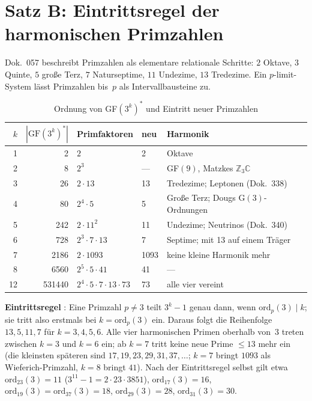 \section{Satz B: Eintrittsregel der harmonischen Primzahlen}

Dok.~057 beschreibt Primzahlen als elementare relationale Schritte:
$2$ Oktave, $3$ Quinte, $5$ große Terz, $7$ Naturseptime, $11$ Undezime,
$13$ Tredezime. Ein $p$-limit-System lässt Primzahlen bis~$p$ als Intervallbausteine zu.

\begin{table}[H]
\centering
\caption{Ordnung von GF$(3^k)^*$ und Eintritt neuer Primzahlen}
\begin{tabular}{rrlll}
\toprule
$k$ & $|\text{GF}(3^k)^*|$ & Primfaktoren & neu & Harmonik \\
\midrule
1 & 2 & $2$ & 2 & Oktave \\
2 & 8 & $2^3$ & --- & GF$(9)$, Matzkes $\mathbb{Z}_3\mathbb{C}$ \\
3 & 26 & $2 \cdot 13$ & 13 & Tredezime; Leptonen (Dok.~338) \\
4 & 80 & $2^4 \cdot 5$ & 5 & Große Terz; Dougs G$(3)$-Ordnungen \\
5 & 242 & $2 \cdot 11^2$ & 11 & Undezime; Neutrinos (Dok.~340) \\
6 & 728 & $2^3 \cdot 7 \cdot 13$ & 7 & Septime; mit 13 auf einem Träger \\
7 & 2186 & $2 \cdot 1093$ & 1093 & keine kleine Harmonik mehr \\
8 & 6560 & $2^5 \cdot 5 \cdot 41$ & 41 & --- \\
12 & 531440 & $2^4 \cdot 5 \cdot 7 \cdot 13 \cdot 73$ & 73 & alle vier vereint \\
\bottomrule
\end{tabular}
\end{table}

\textbf{Eintrittsregel} \BM: Eine Primzahl $p \neq 3$ teilt $3^k - 1$ genau dann,
wenn $\text{ord}_p(3) \mid k$; sie tritt also erstmals bei $k = \text{ord}_p(3)$ ein.
Daraus folgt die Reihenfolge $13, 5, 11, 7$ für $k = 3, 4, 5, 6$. Alle vier
harmonischen Primen oberhalb von~3 treten zwischen $k=3$ und $k=6$ ein; ab $k=7$
tritt keine neue Prime $\leq 13$ mehr ein (die kleinsten späteren sind $17, 19, 23, 29, 31, 37, \dots$; $k=7$ bringt $1093$ als Wieferich-Primzahl, $k=8$ bringt $41$). Nach der Eintrittsregel selbst gilt etwa $\text{ord}_{23}(3)=11$ ($3^{11}-1=2\cdot23\cdot3851$), $\text{ord}_{17}(3)=16$, $\text{ord}_{19}(3)=\text{ord}_{37}(3)=18$, $\text{ord}_{29}(3)=28$, $\text{ord}_{31}(3)=30$.

